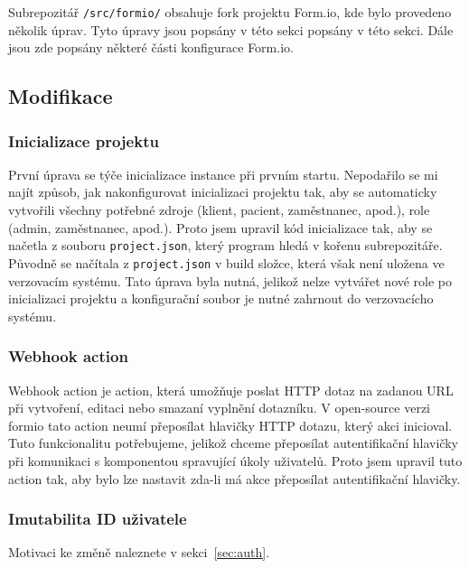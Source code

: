 Subrepozitář \texttt{/src/formio/} obsahuje fork projektu Form.io, kde bylo provedeno několik úprav.
Tyto úpravy jsou popsány v této sekci popsány v této sekci.
Dále jsou zde popsány některé části konfigurace Form.io.

\subsection{Modifikace}\label{subsec:modifikace}

\subsubsection{Inicializace projektu}\label{subsubsec:inicializace-projektu}

První úprava se týče inicializace instance při prvním startu.
Nepodařilo se mi najít způsob, jak nakonfigurovat inicializaci projektu tak, aby se automaticky vytvořili všechny potřebné zdroje (klient, pacient, zaměstnanec, apod.), role (admin, zaměstnanec, apod.).
Proto jsem upravil kód inicializace tak, aby se načetla z souboru \texttt{project.json}, který program hledá v kořenu subrepozitáře.
Původně se načítala z \texttt{project.json} v build složce, která však není uložena ve verzovacím systému.
Tato úprava byla nutná, jelikož nelze vytvářet nové role po inicializaci projektu a konfigurační soubor je nutné zahrnout do verzovacícho systému.

\subsubsection{Webhook action}\label{subsubsec:webhook-action}

Webhook action je action, která umožňuje poslat HTTP dotaz na zadanou URL při vytvoření, editaci nebo smazaní vyplnění dotazníku.
V open-source verzi formio tato action neumí přeposílat hlavičky HTTP dotazu, který akci inicioval.
Tuto funkcionalitu potřebujeme, jelikož chceme přeposílat autentifikační hlavičky při komunikaci s komponentou spravující úkoly uživatelů.
Proto jsem upravil tuto action tak, aby bylo lze nastavit zda-li má akce přeposílat autentifikační hlavičky.

\subsubsection{Imutabilita ID uživatele}\label{subsubsec:imutabilita-id-uzivatele}

Motivaci ke změně naleznete v sekci~\ref{sec:auth}.

